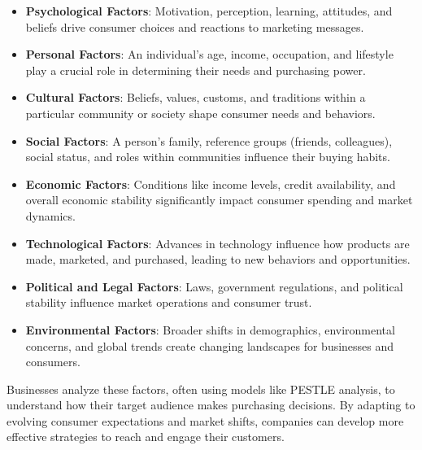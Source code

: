 \documentclass{article}
\begin{document}
\begin{itemize}
    \item \textbf{Psychological Factors}:
    Motivation, perception, learning, attitudes, and beliefs drive consumer choices and reactions to marketing messages.
    \item \textbf{Personal Factors}:
An individual's age, income, occupation, and lifestyle play a crucial role in determining their needs and purchasing power. 
    \item \textbf{Cultural Factors}:
Beliefs, values, customs, and traditions within a particular community or society shape consumer needs and behaviors. 
    \item \textbf{Social Factors}:
A person's family, reference groups (friends, colleagues), social status, and roles within communities influence their buying habits. 
    \item \textbf{Economic Factors}:
    Conditions like income levels, credit availability, and overall economic stability significantly impact consumer spending and market dynamics. 
    \item \textbf{Technological Factors}:
Advances in technology influence how products are made, marketed, and purchased, leading to new behaviors and opportunities. 
    \item \textbf{Political and Legal Factors}:
Laws, government regulations, and political stability influence market operations and consumer trust. 
    \item \textbf{Environmental Factors}:
Broader shifts in demographics, environmental concerns, and global trends create changing landscapes for businesses and consumers. 
\end{itemize}
Businesses analyze these factors, often using models like PESTLE analysis, to understand how their target audience makes purchasing decisions. By adapting to evolving consumer expectations and market shifts, companies can develop more effective strategies to reach and engage their customers.
\end{document}

